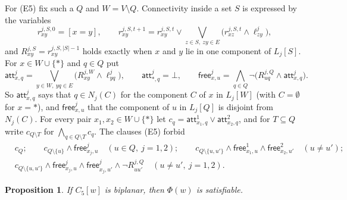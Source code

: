 \documentclass[11pt]{amsart}
\newtheorem{proposition}[theorem]{Proposition}
\theoremstyle{definition}
\theoremstyle{remark}
\numberwithin{equation}{section}
\newcommand{\cw}{C_5[w]}
\newcommand{\lit}[1]{\mathsf{#1}}
\begin{document}
For (E5) fix such a $Q$ and $W=V\setminus Q$. Connectivity inside a set $S$ is expressed by the variables
\[
r^{j,S,0}_{xy}=[x=y],\qquad r^{j,S,t+1}_{xy}=r^{j,S,t}_{xy}\vee\bigvee_{z\in S,\ zy\in E}\bigl(r^{j,S,t}_{xz}\wedge\ell^j_{zy}\bigr),
\]
and $R^{j,S}_{xy}=r^{j,S,|S|-1}_{xy}$ holds exactly when $x$ and $y$ lie in one component of $L_j[S]$. For $x\in W\cup\{\ast\}$ and $q\in Q$ put
\[
\lit{att}^j_{x,q}=\bigvee_{y\in W,\ yq\in E}\bigl(R^{j,W}_{xy}\wedge\ell^j_{yq}\bigr),\qquad \lit{att}^j_{\ast,q}=\bot,\qquad
\lit{free}^j_{x,u}=\bigwedge_{q\in Q}\neg\bigl(R^{j,Q}_{uq}\wedge\lit{att}^j_{x,q}\bigr).
\]
So $\lit{att}^j_{x,q}$ says that $q\in N_j(C)$ for the component $C$ of $x$ in $L_j[W]$ (with $C=\emptyset$ for $x=\ast$), and $\lit{free}^j_{x,u}$ that the component of $u$ in $L_j[Q]$ is disjoint from $N_j(C)$. For every pair $x_1,x_2\in W\cup\{\ast\}$ let $c_q=\lit{att}^1_{x_1,q}\vee\lit{att}^2_{x_2,q}$, and for $T\subseteq Q$ write $c_{Q\setminus T}$ for $\bigwedge_{q\in Q\setminus T}c_q$. The clauses (E5) forbid
\begin{align*}
&c_Q; \qquad c_{Q\setminus\{u\}}\wedge\lit{free}^j_{x_j,u}\quad(u\in Q,\ j=1,2);\qquad
c_{Q\setminus\{u,u'\}}\wedge\lit{free}^1_{x_1,u}\wedge\lit{free}^2_{x_2,u'}\quad(u\ne u');\\
&c_{Q\setminus\{u,u'\}}\wedge\lit{free}^j_{x_j,u}\wedge\lit{free}^j_{x_j,u'}\wedge\neg R^{j,Q}_{uu'}\quad(u\ne u',\ j=1,2).
\end{align*}

\begin{proposition}\label{prop:sound}
If $\cw$ is biplanar, then $\Phi(w)$ is satisfiable.
\end{proposition}
\end{document}
